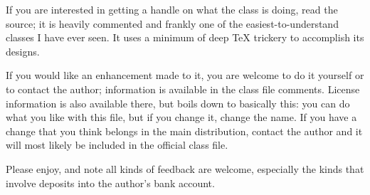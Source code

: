 \documentclass[letterpaper,phd,prettyheadings,chaptercenter,parttop]{byumsphd}
\begin{document}
If you are interested in getting a handle on what the class is doing, read the source; it is heavily commented and frankly one of the easiest-to-understand classes I have ever seen.  It uses a minimum of deep {\TeX} trickery to accomplish its designs.

If you would like an enhancement made to it, you are welcome to do it yourself or to contact the author; information is available in the class file comments.  License information is also available there, but boils down to basically this: you can do what you like with this file, but if you change it, change the name.  If you have a change that you think belongs in the main distribution, contact the author and it will most likely be included in the official class file.

Please enjoy, and note all kinds of feedback are welcome, especially the kinds that involve deposits into the author's bank account.
\end{document}
